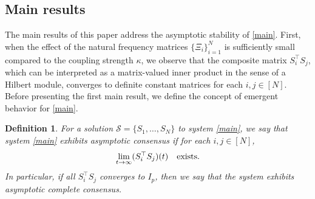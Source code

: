 \documentclass[11pt,reqno]{amsart}
\numberwithin{figure}{section}
\newcommand{\kp}{\kappa}
\newcommand{\St}{  {\textup{St}}(p,n) }
\newtheorem{definition}{Definition}[section]
\begin{document}





 


 

\subsection{Main results}
The main results of this paper address the asymptotic stability of \eqref{main}. First, when the effect of the natural frequency matrices $\{\Xi_i\}_{i=1}^N$ is sufficiently small compared to the coupling strength $\kappa$, we observe that the composite matrix $S_i^\top S_j$, which can be interpreted as a matrix-valued inner product in the sense of a Hilbert module, converges to definite constant matrices for each $i, j \in [N]$. Before presenting the first main result, we define the concept of emergent behavior for \eqref{main}.

\begin{definition}
	For a solution $\mathcal S = \{S_1,\ldots, S_N \}$ to system \eqref{main}, we say that  system \eqref{main} exhibits asymptotic consensus if for each $i,j \in [N]$,
	\[
	\lim_{t\to\infty}  (S_i^\top S_j)(t) \quad \textup{exists}.
	\]
	In particular, if all $S_i^\top S_j$ converges to $I_p$, then we say that the system exhibits asymptotic complete consensus. 
\end{definition}
\end{document}
